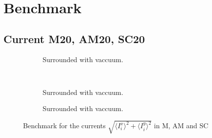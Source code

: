 \documentclass[../main.tex]{subfiles}
\begin{document}
\section{Benchmark}
\subsection{Current M20, AM20, SC20}
\begin{figure}[H]
    \centering
    \begin{subfigure}{0.3\textwidth}
        \centering
        
        \caption{Surrounded with vaccuum.}
        \label{fig:first}
    \end{subfigure}\\
    \begin{subfigure}{0.45\textwidth}
        \centering
        
        \caption{Surrounded with vaccuum.}
        \label{fig:first}
    \end{subfigure}
    \hspace{0.1\textwidth}
    \begin{subfigure}{0.45\textwidth}
        \centering
        
        \caption{Surrounded with vaccuum.}
        \label{fig:first}
    \end{subfigure}
    \caption{Benchmark for the currents $\sqrt{\langle I^x_i\rangle^2 + \langle I^y_i\rangle^2}$ in M, AM and SC}
\end{figure}
\end{document}
